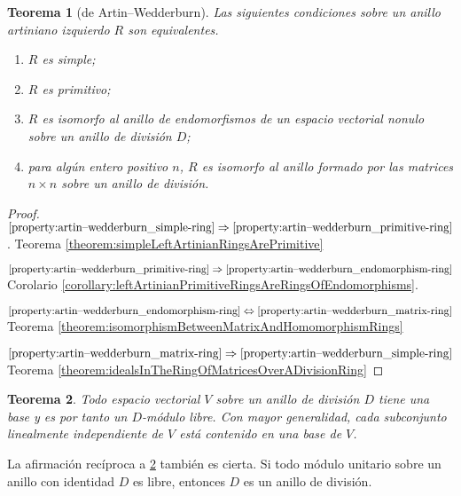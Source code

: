 \documentclass{report}
\newtheorem{theorem}{Teorema}
\begin{document}
  \begin{theorem}[de Artin--Wedderburn]
    Las siguientes condiciones sobre un anillo artiniano izquierdo \(R\) son equivalentes.
    \begin{enumerate}
      \item\label{property:artin--wedderburn_simple-ring}
        \(R\) es simple;
      \item\label{property:artin--wedderburn_primitive-ring}
        \(R\) es primitivo;
      \item\label{property:artin--wedderburn_endomorphism-ring}
        \(R\) es isomorfo al anillo de endomorfismos de un espacio vectorial nonulo sobre un anillo de división \(D\);
      \item\label{property:artin--wedderburn_matrix-ring}
        para algún entero positivo \(n\), \(R\) es isomorfo al anillo formado por las matrices \(n \times n\) sobre un anillo de división.
    \end{enumerate}
  \end{theorem}
  \begin{proof}
    \(\ref{property:artin--wedderburn_simple-ring} \Rightarrow \ref{property:artin--wedderburn_primitive-ring}\).
    Teorema \ref{theorem:simpleLeftArtinianRingsArePrimitive}

    \(\ref{property:artin--wedderburn_primitive-ring} \Rightarrow \ref{property:artin--wedderburn_endomorphism-ring}\)
    Corolario \ref{corollary:leftArtinianPrimitiveRingsAreRingsOfEndomorphisms}.

    \(\ref{property:artin--wedderburn_endomorphism-ring} \Leftrightarrow \ref{property:artin--wedderburn_matrix-ring}\)
    Teorema \ref{theorem:isomorphismBetweenMatrixAndHomomorphismRings}

    \(\ref{property:artin--wedderburn_matrix-ring} \Rightarrow \ref{property:artin--wedderburn_simple-ring}\)
    Teorema \ref{theorem:idealsInTheRingOfMatricesOverADivisionRing}
  \end{proof}

  \newpage

  \begin{theorem}\label{theorem:vectorSpaceBasis}
    Todo espacio vectorial \(V\) sobre un anillo de división \(D\) tiene una base y es por tanto un \(D\)-módulo libre.
    Con mayor generalidad, cada subconjunto linealmente independiente de \(V\) está contenido en una base de \(V\).
  \end{theorem}

  La afirmación recíproca a \ref{theorem:vectorSpaceBasis} también es cierta.
  Si todo módulo unitario sobre un anillo con identidad \(D\) es libre, entonces \(D\) es un anillo de división.
\end{document}
